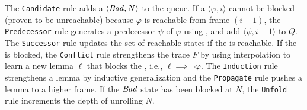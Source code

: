 The \texttt{Candidate} rule adds a \pob $\langle \mathit{Bad}, N \rangle$ to
the queue. If a \pob $\langle \varphi, i \rangle$ cannot be blocked (proven to
be unreachable) because
$\varphi$ is reachable from frame $(i-1)$, the \texttt{Predecessor} rule
generates a predecessor $\psi$ of $\varphi$ using \getP, and add $\langle \psi,
i-1 \rangle$ to $Q$. The \texttt{Successor} rule updates the set of reachable
states if the \pob is reachable. If the \pob is blocked, the \texttt{Conflict}
rule strengthens the trace $F$ by using interpolation to learn a new lemma
$\ell$ that blocks the \pob, i.e., $\ell \implies \neg \varphi$. The
\texttt{Induction} rule strengthens a lemma by inductive generalization and the
\texttt{Propagate} rule pushes a lemma to a higher frame. If the $\mathit{Bad}$ state
has been blocked at $N$, the \texttt{Unfold} rule increments the depth of
unrolling $N$.

